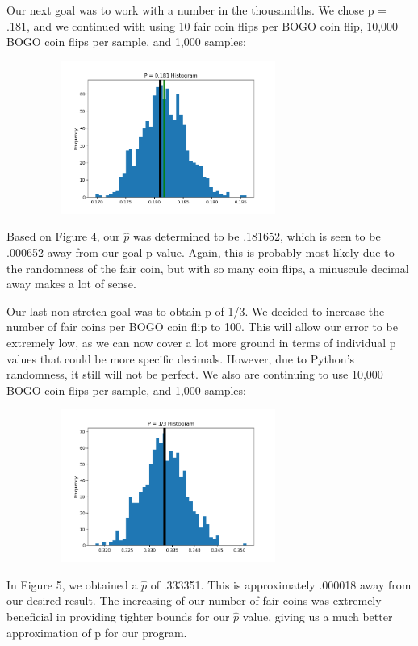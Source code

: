 \documentclass[11pt]{article}
\begin{document}
Our next goal was to work with a number in the thousandths. We chose p = .181, and we continued with using 
10 fair coin flips per BOGO coin flip, 10,000 BOGO coin flips per sample, and 1,000 samples:

\begin{figure}[h]
    \caption
    \centering
    \includegraphics[width=8.5cm, height=5cm]{181-10000.png}
    \centering
\end{figure}

Based on Figure 4, our $\hat{p}$ was determined to be .181652, which is seen to be .000652 away from
our goal p value. Again, this is probably most likely due to the randomness of the fair coin, but with
so many coin flips, a minuscule decimal away makes a lot of sense.

Our last non-stretch goal was to obtain p of 1/3. We decided to increase the number of fair coins per
BOGO coin flip to 100. This will allow our error to be extremely low, as we can now cover a lot more
ground in terms of individual p values that could be more specific decimals. However, due to Python's
randomness, it still will not be perfect. We also are continuing to use 10,000 BOGO coin flips per sample,
and 1,000 samples:

\begin{figure}[h]
    \caption
    \centering
    \includegraphics[width=8.5cm, height=5cm]{33-100coins.png}
    \centering
\end{figure}

In Figure 5, we obtained a $\hat{p}$ of .333351. This is approximately .000018 away from our desired
result. The increasing of our number of fair coins was extremely beneficial in providing tighter bounds 
for our $\hat{p}$ value, giving us a much better approximation of p for our program.
\end{document}
